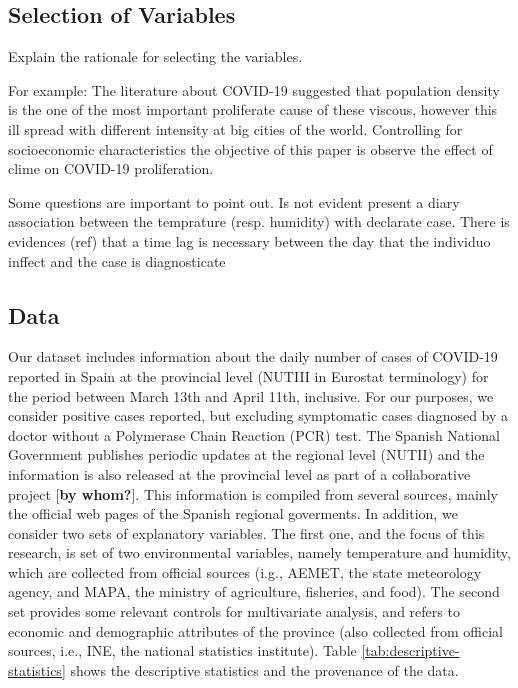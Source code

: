 \documentclass[]{elsarticle} %
\begin{document}
\hypertarget{selection-of-variables}{%
\subsection{Selection of Variables}\label{selection-of-variables}}

Explain the rationale for selecting the variables.

For example: The literature about COVID-19 suggested that population
density is the one of the most important proliferate cause of these
viscous, however this ill spread with different intensity at big cities
of the world. Controlling for socioeconomic characteristics the
objective of this paper is observe the effect of clime on COVID-19
proliferation.

Some questions are important to point out. Is not evident present a
diary association between the temprature (resp. humidity) with declarate
case. There is evidences (ref) that a time lag is necessary between the
day that the individuo inffect and the case is diagnosticate

\hypertarget{data}{%
\subsection{Data}\label{data}}

Our dataset includes information about the daily number of cases of
COVID-19 reported in Spain at the provincial level (NUTIII in Eurostat
terminology) for the period between March 13th and April 11th,
inclusive. For our purposes, we consider positive cases reported, but
excluding symptomatic cases diagnosed by a doctor without a Polymerase
Chain Reaction (PCR) test. The Spanish National Government publishes
periodic updates at the regional level (NUTII) and the information is
also released at the provincial level as part of a collaborative project
{[}\textbf{by whom?}{]}. This information is compiled from several
sources, mainly the official web pages of the Spanish regional
goverments. In addition, we consider two sets of explanatory variables.
The first one, and the focus of this research, is set of two
environmental variables, namely temperature and humidity, which are
collected from official sources (i.g., AEMET, the state meteorology
agency, and MAPA, the ministry of agriculture, fisheries, and food). The
second set provides some relevant controls for multivariate analysis,
and refers to economic and demographic attributes of the province (also
collected from official sources, i.e., INE, the national statistics
institute). Table \ref{tab:descriptive-statistics} shows the descriptive
statistics and the provenance of the data.
\end{document}
